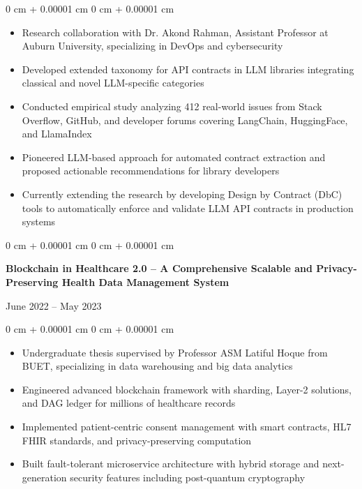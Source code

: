 \documentclass[10pt, letterpaper]{article}
\newenvironment{highlights}{
    \begin{itemize}[
        topsep=0.10 cm,
        parsep=0.10 cm,
        partopsep=0pt,
        itemsep=0pt,
        leftmargin=0 cm + 10pt
    ]
}{
    \end{itemize}
} %
\newenvironment{onecolentry}{
    \begin{adjustwidth}{
        0 cm + 0.00001 cm
    }{
        0 cm + 0.00001 cm
    }
}{
    \end{adjustwidth}
} %
\newenvironment{twocolentry}[2][]{
    \onecolentry
    \def\secondColumn{#2}
    \setcolumnwidth{\fill, 4.5 cm}
    \begin{paracol}{2}
}{
    \switchcolumn \raggedleft \secondColumn
    \end{paracol}
    \endonecolentry
} %
\begin{document}
\begin{onecolentry}
    \begin{highlights}
        \item Research collaboration with Dr. Akond Rahman, Assistant Professor at Auburn University, specializing in DevOps and cybersecurity
        \item Developed extended taxonomy for API contracts in LLM libraries integrating classical and novel LLM-specific categories
        \item Conducted empirical study analyzing 412 real-world issues from Stack Overflow, GitHub, and developer forums covering LangChain, HuggingFace, and LlamaIndex
        \item Pioneered LLM-based approach for automated contract extraction and proposed actionable recommendations for library developers
        \item Currently extending the research by developing Design by Contract (DbC) tools to automatically enforce and validate LLM API contracts in production systems
    \end{highlights}
\end{onecolentry}

\begin{twocolentry}{
    {June 2022 – May 2023}
}
    \textbf{Blockchain in Healthcare 2.0 -- A Comprehensive Scalable and Privacy-Preserving Health Data Management System}
\end{twocolentry}

\begin{onecolentry}
    \begin{highlights}
        \item Undergraduate thesis supervised by Professor ASM Latiful Hoque from BUET, specializing in data warehousing and big data analytics
        \item Engineered advanced blockchain framework with sharding, Layer-2 solutions, and DAG ledger for millions of healthcare records
        \item Implemented patient-centric consent management with smart contracts, HL7 FHIR standards, and privacy-preserving computation
        \item Built fault-tolerant microservice architecture with hybrid storage and next-generation security features including post-quantum cryptography
    \end{highlights}
\end{onecolentry}
\end{document}
